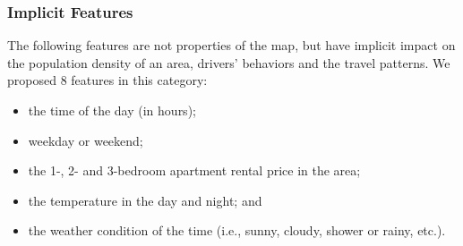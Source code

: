 \subsubsection{Implicit Features}

The following features are not properties of the map, but have implicit impact
on the population density of an area, drivers' behaviors and the travel patterns.
We proposed 8 features in this category: 
\begin{itemize}
\setlength{\itemsep}{0pt}
\setlength{\parsep}{0pt}
\setlength{\parskip}{0pt}
\item the time of the day (in hours); 
\item weekday or weekend; 
\item the 1-, 2- and 3-bedroom apartment rental price in the area; 
\item the temperature in the day and night; and 
\item the weather condition of the time (i.e., sunny, cloudy, shower or rainy, etc.). 
\end{itemize}


